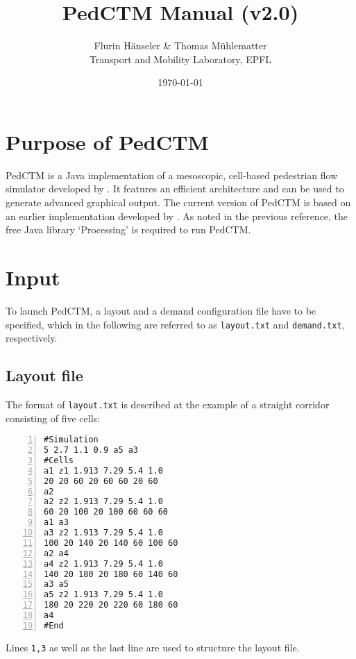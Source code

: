 \documentclass[a4paper,12pt]{article}
\begin{document}
\title{PedCTM Manual (v2.0)}
\author{Flurin H\"anseler \& Thomas M\"uhlematter \\ Transport and Mobility Laboratory, EPFL}
\date{\today}
\maketitle

\section{Purpose of PedCTM}

PedCTM is a Java implementation of a mesoscopic, cell-based pedestrian flow simulator developed by \citet{PedCTMPartB}. It features an efficient architecture and can be used to generate advanced graphical output. The current version of PedCTM is based on an earlier implementation developed by \cite{muhlematter_thesis}. As noted in the previous reference, the free Java library `Processing' is required to run PedCTM. %


\section{Input}
To launch PedCTM, a layout and a demand configuration file have to be specified, which in the following are referred to as \verb+layout.txt+ and \verb+demand.txt+, respectively.

\subsection{Layout file}\label{layout_file}
The format of \verb+layout.txt+ is described at the example of a straight corridor consisting of five cells:
\begin{Verbatim}[numbers=left]
#Simulation
5 2.7 1.1 0.9 a5 a3
#Cells
a1 z1 1.913 7.29 5.4 1.0
20 20 60 20 60 60 20 60
a2
a2 z2 1.913 7.29 5.4 1.0
60 20 100 20 100 60 60 60
a1 a3
a3 z2 1.913 7.29 5.4 1.0
100 20 140 20 140 60 100 60
a2 a4
a4 z2 1.913 7.29 5.4 1.0
140 20 180 20 180 60 140 60
a3 a5
a5 z2 1.913 7.29 5.4 1.0
180 20 220 20 220 60 180 60
a4
#End
\end{Verbatim}
Lines \verb+1,3+ as well as the last line are used to structure the layout file.
\end{document}
